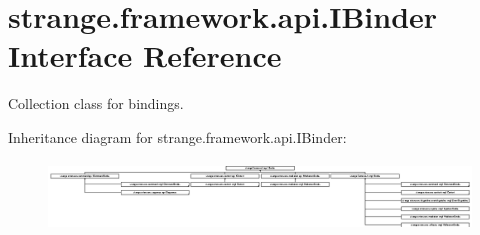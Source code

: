 \hypertarget{interfacestrange_1_1framework_1_1api_1_1_i_binder}{\section{strange.\-framework.\-api.\-I\-Binder Interface Reference}
\label{interfacestrange_1_1framework_1_1api_1_1_i_binder}
}


Collection class for bindings.  


Inheritance diagram for strange.\-framework.\-api.\-I\-Binder\-:\begin{figure}[H]
\begin{center}
\leavevmode
\includegraphics[height=1.843621cm]{interfacestrange_1_1framework_1_1api_1_1_i_binder}
\end{center}
\end{figure}
